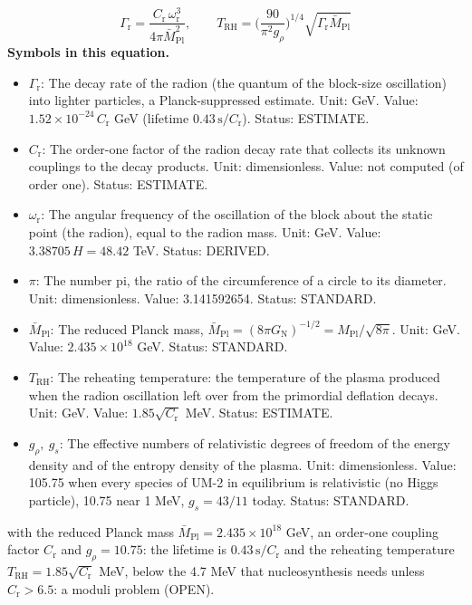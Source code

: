 \documentclass[
  10pt,
]{article}
\providecommand{\tightlist}{%
  \setlength{\itemsep}{0pt}\setlength{\parskip}{0pt}}
\begin{document}
\[ \Gamma_{\mathrm{r}} = \frac{C_{\mathrm{r}}\,\omega_{\mathrm{r}}^3}{4\pi\bar M_{\mathrm{Pl}}^2},\qquad T_{\mathrm{RH}} = \Big(\frac{90}{\pi^2g_\rho}\Big)^{1/4}\sqrt{\Gamma_{\mathrm{r}}\bar M_{\mathrm{Pl}}} \]
\textbf{Symbols in this equation.}

\begin{itemize}
\tightlist
\item
  \(\Gamma_{\mathrm{r}}\): The decay rate of the radion (the quantum of
  the block-size oscillation) into lighter particles, a
  Planck-suppressed estimate. Unit: GeV. Value:
  \(1.52\times10^{-24}\,C_{\mathrm{r}}\) GeV (lifetime
  \(0.43\,\text{s}/C_{\mathrm{r}}\)). Status: ESTIMATE.
\item
  \(C_{\mathrm{r}}\): The order-one factor of the radion decay rate that
  collects its unknown couplings to the decay products. Unit:
  dimensionless. Value: not computed (of order one). Status: ESTIMATE.
\item
  \(\omega_{\mathrm{r}}\): The angular frequency of the oscillation of
  the block about the static point (the radion), equal to the radion
  mass. Unit: GeV. Value: \(3.38705\,H = 48.42\) TeV. Status: DERIVED.
\item
  \(\pi\): The number pi, the ratio of the circumference of a circle to
  its diameter. Unit: dimensionless. Value: 3.141592654. Status:
  STANDARD.
\item
  \(\bar M_{\mathrm{Pl}}\): The reduced Planck mass,
  \(\bar M_{\mathrm{Pl}} = (8\pi G_{\mathrm{N}})^{-1/2} = M_{\mathrm{Pl}}/\sqrt{8\pi}\).
  Unit: GeV. Value: \(2.435\times10^{18}\) GeV. Status: STANDARD.
\item
  \(T_{\mathrm{RH}}\): The reheating temperature: the temperature of the
  plasma produced when the radion oscillation left over from the
  primordial deflation decays. Unit: GeV. Value:
  \(1.85\sqrt{C_{\mathrm{r}}}\) MeV. Status: ESTIMATE.
\item
  \(g_\rho,\ g_s\): The effective numbers of relativistic degrees of
  freedom of the energy density and of the entropy density of the
  plasma. Unit: dimensionless. Value: 105.75 when every species of UM-2
  in equilibrium is relativistic (no Higgs particle), 10.75 near 1 MeV,
  \(g_s = 43/11\) today. Status: STANDARD.
\end{itemize}

with the reduced Planck mass
\(\bar M_{\mathrm{Pl}} = 2.435\times10^{18}\) GeV, an order-one coupling
factor \(C_{\mathrm{r}}\) and \(g_\rho = 10.75\): the lifetime is
\(0.43\,\text{s}/C_{\mathrm{r}}\) and the reheating temperature
\(T_{\mathrm{RH}} = 1.85\sqrt{C_{\mathrm{r}}}\) MeV, below the 4.7 MeV
that nucleosynthesis needs unless \(C_{\mathrm{r}} > 6.5\): a moduli
problem (OPEN).
\end{document}
